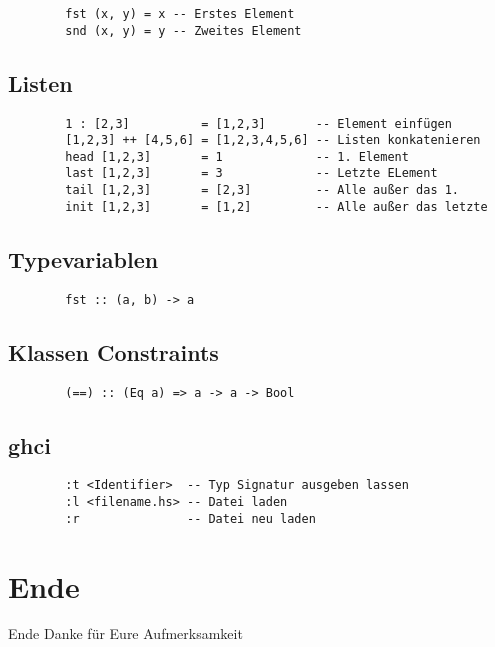 \documentclass[
	aspectratio=169, 
	10pt 
]{beamer}
\begin{document}
\begin{frame}[fragile,t]{\insertsubsection}
	\begin{verbatim}
		fst (x, y) = x -- Erstes Element
		snd (x, y) = y -- Zweites Element  
	\end{verbatim}
\end{frame}

\subsection{Listen}
\begin{frame}[fragile]{\insertsubsection} 
	\begin{verbatim}
		1 : [2,3]          = [1,2,3]       -- Element einfügen
		[1,2,3] ++ [4,5,6] = [1,2,3,4,5,6] -- Listen konkatenieren
		head [1,2,3]       = 1             -- 1. Element
		last [1,2,3]       = 3             -- Letzte ELement
		tail [1,2,3]       = [2,3]         -- Alle außer das 1.
		init [1,2,3]       = [1,2]         -- Alle außer das letzte
	\end{verbatim}
\end{frame}

\subsection{Typevariablen}
\begin{frame}[fragile]{\insertsubsection}
	\begin{verbatim}
		fst :: (a, b) -> a
	\end{verbatim}
\end{frame}

\subsection{Klassen Constraints}
\begin{frame}[fragile]{\insertsubsection}
	\begin{verbatim}
		(==) :: (Eq a) => a -> a -> Bool
	\end{verbatim}
\end{frame}

\subsection{ghci}
\begin{frame}[fragile]{\insertsubsection} 
	\begin{verbatim}
		:t <Identifier>  -- Typ Signatur ausgeben lassen
		:l <filename.hs> -- Datei laden
		:r               -- Datei neu laden
	\end{verbatim}
\end{frame}

\section{Ende}
\begin{frame}{Ende}
	\center Danke für Eure Aufmerksamkeit
\end{frame}
\end{document}
